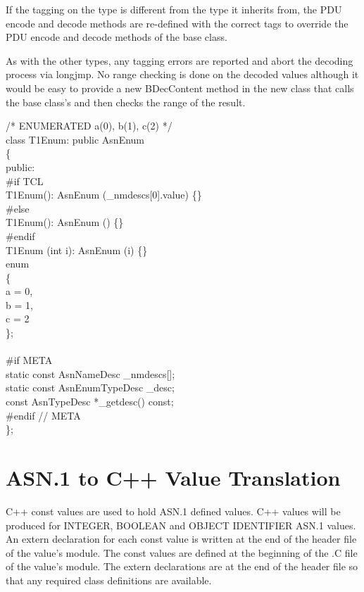 If the tagging on the type is different from the type it inherits
from, the PDU encode and decode methods are re-defined with the
correct tags to override the PDU encode and decode methods of the base
class.

As with the other types, any tagging errors are reported and abort the
decoding process via {\C longjmp}.  No range checking is done on the
decoded values although it would be easy to provide a new
{\C BDecContent} method in the new class that calls the base class's
and then checks the range of the result.

\begin{Ccode}
/* ENUMERATED { a(0), b(1), c(2) } */\\
class T1Enum: public AsnEnum\\
\{\\
public:\\
\#if TCL\\
         \>               \>\>T1Enum(): AsnEnum (\_nmdescs[0].value) \{\}\\
\#else\\
         \>               \>\>T1Enum(): AsnEnum () \{\}\\
\#endif\+\\
                          \>\>T1Enum (int i): AsnEnum (i) \{\}\\
  enum\\
  \{\+\\
    a = 0,\\
    b = 1,\\
    c = 2\-\\
  \};\\
\\
\<\#if META\\
  static const AsnNameDesc      \>\>\_nmdescs[];\\
  static const AsnEnumTypeDesc  \>\>\_desc;\\
  const AsnTypeDesc             \>\>*\_getdesc() const;\\
\<\#endif // META\\
\<\};
\end{Ccode}

\section{\label{val-gen-C++-section}ASN.1 to C++ Value Translation}

C++ {\C const} values are used to hold ASN.1 defined values.  C++
values will be produced for INTEGER, BOOLEAN and OBJECT IDENTIFIER
ASN.1 values.  An {\C extern} declaration for each {\C const} value is
written at the end of the header file of the value's module.  The
{\C const} values are defined at the beginning of the {\ufn .C} file
of the value's module.  The {\C extern} declarations are at the end
of the header file so that any required class definitions are
available.

